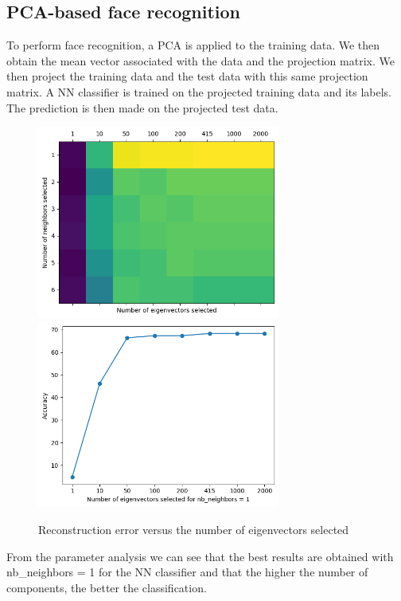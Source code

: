 \subsection{PCA-based face recognition}

To perform face recognition, a PCA is applied to the training data. We then obtain the mean vector associated with the data and the projection matrix. We then project the training data and the test data with this same projection matrix. A NN classifier is trained on the projected training data and its labels. The prediction is then made on the projected test data.

\begin{figure}[h]
	\centering
	\includegraphics[width=8.0cm]{./Ressources/matrix_neighbors_eigenvectors.png}
	\includegraphics[width=8.0cm]{./Ressources/accuracy_1neighbors.png}
	\vspace{-3mm}
	\caption{Reconstruction error versus the number of eigenvectors selected}
	\label{fig:rect_result}
\end{figure}

From the parameter analysis we can see that the best results are obtained with nb\_neighbors = 1 for the NN classifier and that the higher the number of components, the better the classification.





